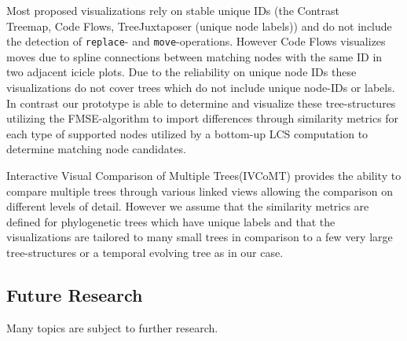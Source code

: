 
Most proposed visualizations rely on stable unique IDs (the Contrast\\Treemap\cite{tu2007visualizing}, Code Flows\cite{telea2008code}, TreeJuxtaposer\cite{munzner2003treejuxtaposer} (unique node labels)) and do not include the detection of \texttt{replace}- and \texttt{move}-operations. However Code Flows visualizes moves due to spline connections between matching nodes with the same ID in two adjacent icicle plots. Due to the reliability on unique node IDs these visualizations do not cover trees which do not include unique node-IDs or labels. In contrast our prototype is able to determine and visualize these tree-structures utilizing the FMSE-algorithm to import differences through similarity metrics for each type of supported nodes utilized by a bottom-up LCS computation to determine matching node candidates.

Interactive Visual Comparison of Multiple Trees(IVCoMT\cite{bremm2011interactive}) provides the ability to compare multiple trees through various linked views allowing the comparison on different levels of detail. However we assume that the similarity metrics are defined for phylogenetic trees which have unique labels and that the visualizations are tailored to many small trees in comparison to a few very large tree-structures or a temporal evolving tree as in our case.

\subsection{Future Research}
Many topics are subject to further research. 


